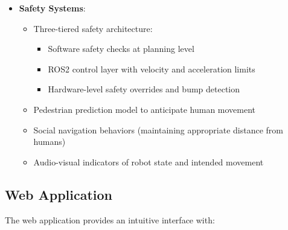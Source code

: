\documentclass[12pt]{article}
\begin{document}
\begin{itemize}
    \item \textbf{Safety Systems}:
    \begin{itemize}
        \item Three-tiered safety architecture:
        \begin{itemize}
            \item Software safety checks at planning level
            \item ROS2 control layer with velocity and acceleration limits
            \item Hardware-level safety overrides and bump detection
        \end{itemize}
        \item Pedestrian prediction model to anticipate human movement
        \item Social navigation behaviors (maintaining appropriate distance from humans)
        \item Audio-visual indicators of robot state and intended movement
    \end{itemize}
\end{itemize}

\subsection{Web Application}

The web application provides an intuitive interface with:
\end{document}
